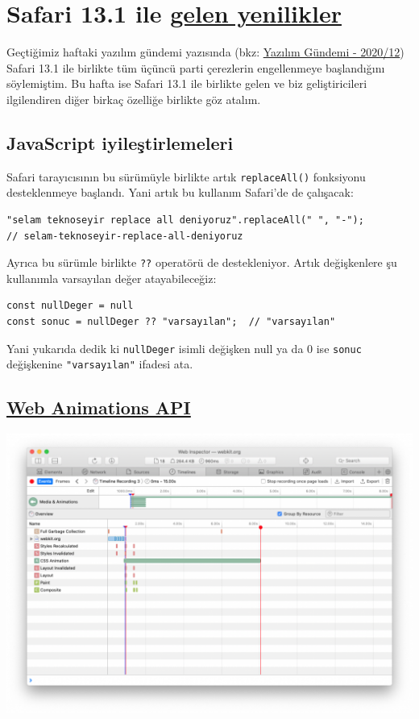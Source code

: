 \documentclass[11pt]{article}
\begin{document}
\section{Safari 13.1 ile \href{https://webkit.org/blog/10247/new-webkit-features-in-safari-13-1/}{gelen yenilikler}}
\label{sec:org5039ca2}
Geçtiğimiz haftaki yazılım gündemi yazısında (bkz: \href{../12/yazilim-gundemi-2020-12.pdf}{Yazılım Gündemi - 2020/12})
Safari 13.1 ile birlikte tüm üçüncü parti çerezlerin engellenmeye başlandığını
söylemiştim. Bu hafta ise Safari 13.1 ile birlikte gelen ve biz
geliştiricileri ilgilendiren diğer birkaç özelliğe birlikte göz atalım.

\subsection{JavaScript iyileştirlemeleri}
\label{sec:orgb12029c}
Safari tarayıcısının bu sürümüyle birlikte artık \texttt{replaceAll()} fonksiyonu
desteklenmeye başlandı. Yani artık bu kullanım Safari'de de çalışacak:
\begin{verbatim}
"selam teknoseyir replace all deniyoruz".replaceAll(" ", "-");
// selam-teknoseyir-replace-all-deniyoruz
\end{verbatim}

Ayrıca bu sürümle birlikte \texttt{??} operatörü de destekleniyor. Artık
değişkenlere şu kullanımla varsayılan değer atayabileceğiz:
\begin{verbatim}
const nullDeger = null
const sonuc = nullDeger ?? "varsayılan";  // "varsayılan"
\end{verbatim}
Yani yukarıda dedik ki \texttt{nullDeger} isimli değişken null ya da 0 ise \texttt{sonuc}
değişkenine \texttt{"varsayılan"} ifadesi ata.
\subsection{\href{https://webkit.org/blog/8343/web-animations-in-webkit/}{Web Animations API}}
\label{sec:orgf4a9444}
\begin{center}
\includegraphics[width=.9\linewidth]{gorseller/safari13-web-animations.png}
\end{center}
\end{document}

